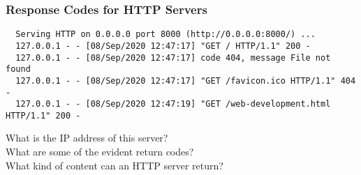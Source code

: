 \documentclass[14pt,aspectratio=169]{beamer}
\begin{document}
%
\begin{frame}[fragile]
  \frametitle{Response Codes for HTTP Servers}
  \normalsize
  \hspace*{-.15in}
  \begin{minipage}{6in}
    \vspace*{.25in}
    \begin{verbatim}
  Serving HTTP on 0.0.0.0 port 8000 (http://0.0.0.0:8000/) ...
  127.0.0.1 - - [08/Sep/2020 12:47:17] "GET / HTTP/1.1" 200 -
  127.0.0.1 - - [08/Sep/2020 12:47:17] code 404, message File not found
  127.0.0.1 - - [08/Sep/2020 12:47:17] "GET /favicon.ico HTTP/1.1" 404 -
  127.0.0.1 - - [08/Sep/2020 12:47:19] "GET /web-development.html HTTP/1.1" 200 -
    \end{verbatim}
  \end{minipage}
  \vspace*{.25in}
  \begin{center}
    \normalsize \noindent What is the IP address of this server? \\
    \normalsize \noindent What are some of the evident return codes? \\
    \normalsize \noindent What kind of content can an HTTP server return? \\
  \end{center}
\end{frame}
\end{document}
